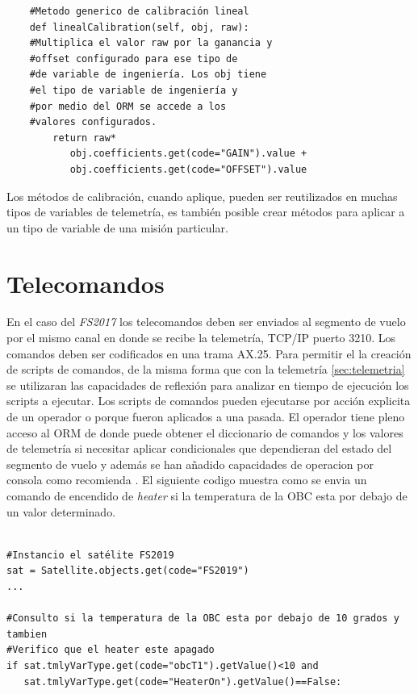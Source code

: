 \documentclass[twoside,twocolumn]{article}
\begin{document}
{{\begin{verbatim}
    #Metodo generico de calibración lineal
    def linealCalibration(self, obj, raw):
	#Multiplica el valor raw por la ganancia y 
	#offset configurado para ese tipo de
	#de variable de ingeniería. Los obj tiene 
	#el tipo de variable de ingeniería y
	#por medio del ORM se accede a los 
	#valores configurados.
        return raw*
	       obj.coefficients.get(code="GAIN").value + 
	       obj.coefficients.get(code="OFFSET").value

\end{verbatim}

Los métodos de calibración, cuando aplique, pueden ser reutilizados en muchas tipos de variables de telemetría, es también posible crear métodos para aplicar a un tipo de variable de una misión particular.



\section{Telecomandos}
En el caso del \textit{FS2017} los telecomandos deben ser enviados al segmento de vuelo por el mismo canal en donde se recibe la telemetría, TCP/IP puerto 3210. Los comandos deben ser codificados en una trama AX.25. 
Para permitir el la creación de scripts de comandos, de la misma forma que con la telemetría \ref{sec:telemetria} se utilizaran las capacidades de reflexión para analizar en tiempo de ejecución los scripts a ejecutar. Los scripts de comandos pueden ejecutarse por acción explicita de un operador o porque fueron aplicados a una pasada. 
El operador tiene pleno acceso al ORM de donde puede obtener el diccionario de comandos y los valores de telemetría si necesitar aplicar condicionales que dependieran del estado del segmento de vuelo y además se han añadido capacidades de operacion por consola como recomienda \cite{galal2001satellite}. El siguiente codigo muestra como se envia un comando de encendido de \textit{heater} si la temperatura de la OBC esta por debajo de un valor determinado.

\begin{verbatim}

#Instancio el satélite FS2019
sat = Satellite.objects.get(code="FS2019")
...

#Consulto si la temperatura de la OBC esta por debajo de 10 grados y tambien
#Verifico que el heater este apagado
if sat.tmlyVarType.get(code="obcT1").getValue()<10 and 
   sat.tmlyVarType.get(code="HeaterOn").getValue()==False:
   

\end{verbatim}}}
\end{document}
